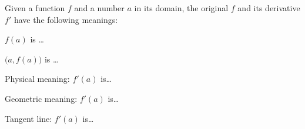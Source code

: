 
Given a function $f$ and a number $a$ in its domain, the original $f$ and its derivative $f'$ have the following meanings:

\begin{ProblemSet}[pencil space=1in]
 \begin{Problem}
  $f(a)$ is \dots
 \end{Problem}
 \begin{Problem}
  $\bigl(a, f(a) \bigr)$ is \dots
 \end{Problem}
 \begin{Problem}
  Physical meaning:
  $f'(a)$ is\dots
 \end{Problem}
 \begin{Problem}
  Geometric meaning:
  $f'(a)$ is\dots
 \end{Problem}
 \begin{Problem}
  Tangent line:
  $f'(a)$ is\dots
 \end{Problem}
\end{ProblemSet}

